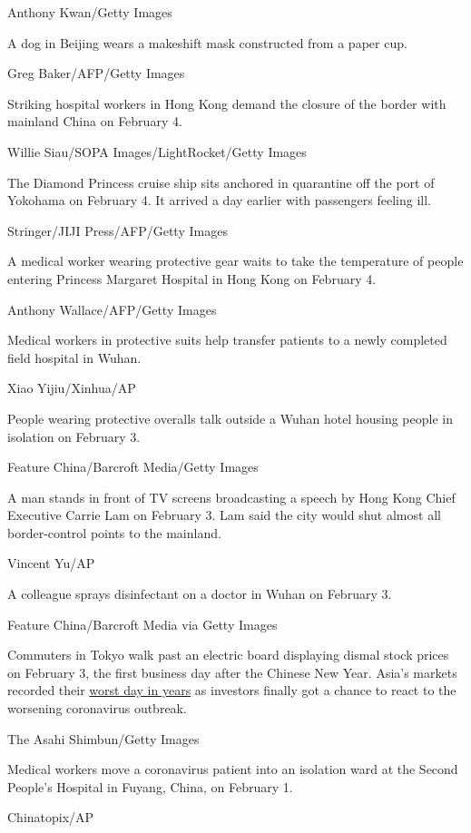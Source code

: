 Anthony Kwan/Getty Images

A dog in Beijing wears a makeshift mask constructed from a paper cup.

Greg Baker/AFP/Getty Images

Striking hospital workers in Hong Kong demand the closure of the border
with mainland China on February 4.

Willie Siau/SOPA Images/LightRocket/Getty Images

The Diamond Princess cruise ship sits anchored in quarantine off the
port of Yokohama on February 4. It arrived a day earlier with passengers
feeling ill.

Stringer/JIJI Press/AFP/Getty Images

A medical worker wearing protective gear waits to take the temperature
of people entering Princess Margaret Hospital in Hong Kong on February
4.

Anthony Wallace/AFP/Getty Images

Medical workers in protective suits help transfer patients to a newly
completed field hospital in Wuhan.

Xiao Yijiu/Xinhua/AP

People wearing protective overalls talk outside a Wuhan hotel housing
people in isolation on February 3.

Feature China/Barcroft Media/Getty Images

A man stands in front of TV screens broadcasting a speech by Hong Kong
Chief Executive Carrie Lam on February 3. Lam said the city would shut
almost all border-control points to the mainland.

Vincent Yu/AP

A colleague sprays disinfectant on a doctor in Wuhan on February 3.

Feature China/Barcroft Media via Getty Images

Commuters in Tokyo walk past an electric board displaying dismal stock
prices on February 3, the first business day after the Chinese New Year.
Asia's markets recorded their
\href{https://www.cnn.com/2020/02/02/investing/china-markets-coronavirus/index.html}{worst
day in years} as investors finally got a chance to react to the
worsening coronavirus outbreak.

The Asahi Shimbun/Getty Images

Medical workers move a coronavirus patient into an isolation ward at the
Second People's Hospital in Fuyang, China, on February 1.

Chinatopix/AP

